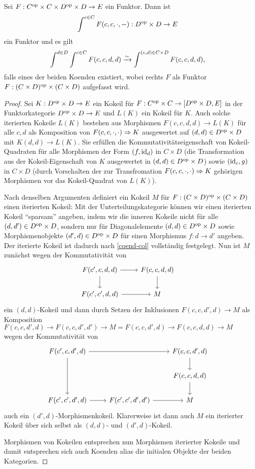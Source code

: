 \begin{lemma}
  \label{coend-fubini}
  Sei $F: C^\mathrm{op} \times C \times D^\mathrm{op} \times D \to E$ ein Funktor. Dann
  ist
  \[ \int^{c \in C} F(c, c, \cdot, -): D^\mathrm{op} \times D \to E \]
  ein Funktor und es gilt
  \[ \int^{d \in D} \int^{c \in C} F(c, c, d, d)
  \xrightarrow[]{\sim} \int^{(c, d) \in C \times D} F(c, c, d, d),
  \]
  falls eines der beiden Koenden existiert, wobei rechts $F$ als
  Funktor $F: (C \times D)^\mathrm{op} \times (C \times D)$ aufgefasst wird.
\end{lemma}
\begin{proof}
  Sei $K: D^\mathrm{op} \times D \to E$ ein Kokeil für $F: C^\mathrm{op} \times C \to
  [D^\mathrm{op} \times D, E]$ in der Funktorkategorie $D^\mathrm{op} \times D \to E$
  und $L(K)$ ein Kokeil für $K$. Auch solche iterierten Kokeile $L(K)$
  bestehen aus Morphismen $F(c, c, d, d) \to L(K)$ für alle $c, d$ als
  Komposition von $F(c, c, \cdot, \cdot) \Rightarrow K$ ausgewertet auf
  $(d, d) \in D^\mathrm{op} \times D$ mit $K(d, d) \to L(K)$. Sie erfüllen die
  Kommutativitätseigenschaft von Kokeil-Quadraten für alle Morphismen
  der Form $(f, \operatorname{id}_d)$ in $C \times D$ (die Transformation aus der
  Kokeil-Eigenschaft von $K$ ausgewertet in $(d, d) \in D^\mathrm{op} \times
  D$) sowie $(\operatorname{id}_c, g)$ in $C \times D$ (durch Vorschalten der zur
  Transfromation $F(c, c, \cdot, \cdot) \Rightarrow K$ gehörigen
  Morphismen vor das Kokeil-Quadrat von $L(K)$).

  Nach denselben Argumenten definiert ein Kokeil $M$ für $F: (C \times
  D)^\mathrm{op} \times (C \times D)$ einen iterierten Kokeil: Mit der
  Unterteilungskategorie können wir einen iterierten Kokeil
  ``sparsam'' angeben, indem wir die inneren Kokeile nicht für alle
  $(d, d') \in D^\mathrm{op} \times D$, sondern nur für Diagonalelemente $(d,
  d) \in D^\mathrm{op} \times D$ sowie Morphismenobjekte $(d', d) \in D^\mathrm{op}
  \times D$ für einen Morphismus $f: d \to d'$ angeben. Der iterierte
  Kokeil ist dadurch nach \ref{coend-col} vollständig festgelegt. Nun
  ist $M$ zunächst wegen der Kommutativität von
  \[ \begin{tikzcd}
    F(c', c, d, d) \arrow{r} \arrow{d} & F(c, c, d, d) \arrow{d} \\
    F(c', c', d, d) \arrow{r} & M
  \end{tikzcd} \]
  ein $(d, d)$-Kokeil und dann durch Setzen der Inklusionen $F(c, c,
  d', d) \to M$ als Komposition $F(c, c, d', d) \to F(c, c, d', d')
  \to M = F(c, c, d', d) \to F(c, c, d, d) \to M$ wegen der
  Kommutativität von
  \[ \begin{tikzcd}
    F(c', c, d', d) \arrow{rr} \arrow{dd} & & F(c, c, d', d) \arrow{d} \\
    & & F(c, c, d, d) \arrow{d} \\
    F(c', c', d', d) \arrow{r} & F(c', c', d', d') \arrow{r} & M
  \end{tikzcd} \]
  auch ein $(d', d)$-Morphismenkokeil. Klarerweise ist dann auch $M$
  ein iterierter Kokeil über sich selbst als $(d, d)$- und $(d',
  d)$-Kokeil.

  Morphismen von Kokeilen entsprechen nun Morphismen iterierter
  Kokeile und damit entsprechen sich auch Koenden alias die initialen
  Objekte der beiden Kategorien.
\end{proof}
